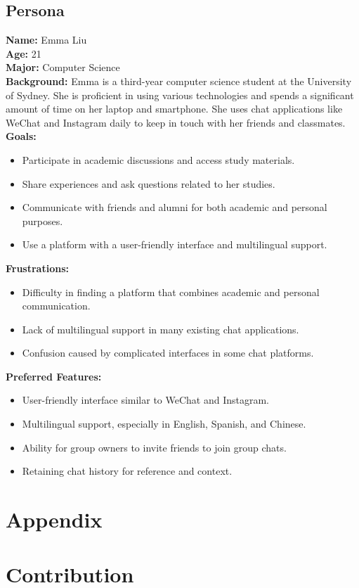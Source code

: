 \documentclass[12pt]{article}
\begin{document}
\subsection*{Persona}
    \textbf{Name:} Emma Liu \\
    \textbf{Age:} 21 \\
    \textbf{Major:} Computer Science \\
    \textbf{Background:} Emma is a third-year computer science student at the University of Sydney. She is proficient in using various technologies and spends a significant amount of time on her laptop and smartphone. She uses chat applications like WeChat and Instagram daily to keep in touch with her friends and classmates. \\
    \textbf{Goals:} 
    \begin{itemize}
        \item Participate in academic discussions and access study materials.
        \item Share experiences and ask questions related to her studies.
        \item Communicate with friends and alumni for both academic and personal purposes.
        \item Use a platform with a user-friendly interface and multilingual support.
    \end{itemize}
    \textbf{Frustrations:} 
    \begin{itemize}
        \item Difficulty in finding a platform that combines academic and personal communication.
        \item Lack of multilingual support in many existing chat applications.
        \item Confusion caused by complicated interfaces in some chat platforms.
    \end{itemize}
    \textbf{Preferred Features:} 
    \begin{itemize}
        \item User-friendly interface similar to WeChat and Instagram.
        \item Multilingual support, especially in English, Spanish, and Chinese.
        \item Ability for group owners to invite friends to join group chats.
        \item Retaining chat history for reference and context.
    \end{itemize}
    
\section*{Appendix}

\section*{Contribution}


 
\end{document}
